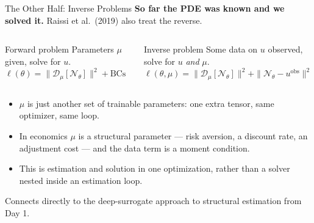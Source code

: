 \documentclass[aspectratio=169,11pt]{beamer}
\newcommand{\emphc}[1]{\textcolor{harvardcrimson}{#1}}
\begin{document}
\begin{frame}{The Other Half: Inverse Problems}
\textbf{So far the PDE was known and we solved it.} Raissi et al.\ (2019) also treat the reverse.

\vspace{0.4em}
\begin{columns}[T]
\begin{block}{Forward problem}
\small
Parameters $\mu$ given, solve for $u$.\\[4pt]
$\ell(\theta) = \|\mathcal{D}_\mu[\mathcal{N}_\theta]\|^2 + \text{BCs}$
\end{block}

\begin{alertblock}{Inverse problem}
\small
Some data on $u$ observed, solve for $u$ \emph{and} $\mu$.\\[4pt]
$\ell(\theta,\mu) = \|\mathcal{D}_\mu[\mathcal{N}_\theta]\|^2 + \|\mathcal{N}_\theta - u^{\text{obs}}\|^2$
\end{alertblock}
\end{columns}

\vspace{0.5em}
\begin{itemize}\setlength\itemsep{3pt}
    \item $\mu$ is just \emphc{another set of trainable parameters}: one extra tensor, same optimizer, same loop.
    \item In economics $\mu$ is a \emphc{structural parameter} --- risk aversion, a discount rate, an adjustment cost --- and the data term is a moment condition.
    \item This is estimation and solution in \emphc{one} optimization, rather than a solver nested inside an estimation loop.
\end{itemize}

\vspace{0.3em}
{\footnotesize Connects directly to the deep-surrogate approach to structural estimation from Day 1.}
\end{frame}
\end{document}
